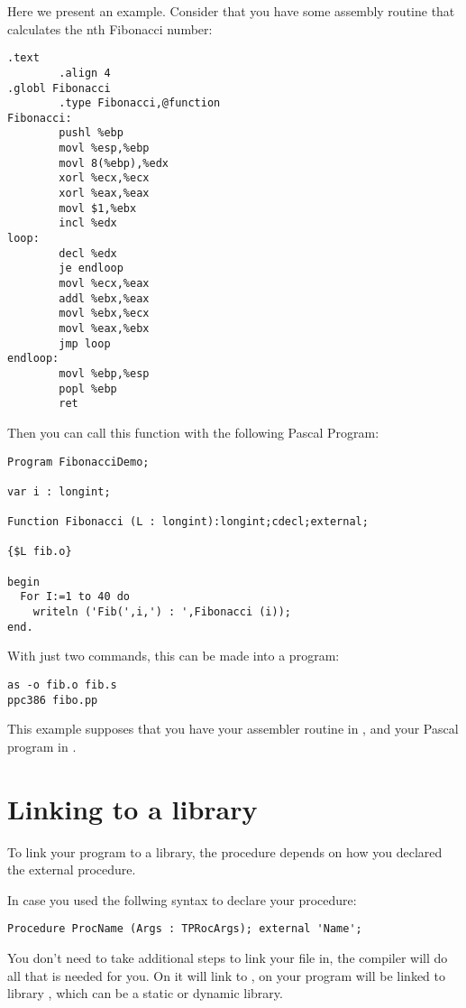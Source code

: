 Here we present an example. Consider that you have some assembly routine that
calculates the nth Fibonacci number:
\begin{verbatim}
.text
        .align 4
.globl Fibonacci
        .type Fibonacci,@function
Fibonacci:
        pushl %ebp
        movl %esp,%ebp
        movl 8(%ebp),%edx
        xorl %ecx,%ecx
        xorl %eax,%eax
        movl $1,%ebx
        incl %edx
loop:
        decl %edx
        je endloop
        movl %ecx,%eax
        addl %ebx,%eax
        movl %ebx,%ecx
        movl %eax,%ebx
        jmp loop
endloop:
        movl %ebp,%esp
        popl %ebp
        ret
\end{verbatim}
Then you can call this function with the following Pascal Program:
\begin{verbatim}
Program FibonacciDemo;

var i : longint;

Function Fibonacci (L : longint):longint;cdecl;external;

{$L fib.o}

begin
  For I:=1 to 40 do
    writeln ('Fib(',i,') : ',Fibonacci (i));
end.
\end{verbatim}
With just two commands, this can be made into a program:
\begin{verbatim}
as -o fib.o fib.s
ppc386 fibo.pp
\end{verbatim}
This example supposes that you have your assembler routine in ,
and your Pascal program in .

\section{Linking to a library}
\label{se:LinkOut}

To link your program to a library, the procedure depends on how you declared
the external procedure.

In case you used the follwing syntax to declare your procedure:
\begin{verbatim}
Procedure ProcName (Args : TPRocArgs); external 'Name';
\end{verbatim}
You don't need to take additional steps to link your file in, the compiler
will do all that is needed for you. On \windowsnt it will link to
, on \linux your program will be linked to library
, which can be a static or dynamic library.

